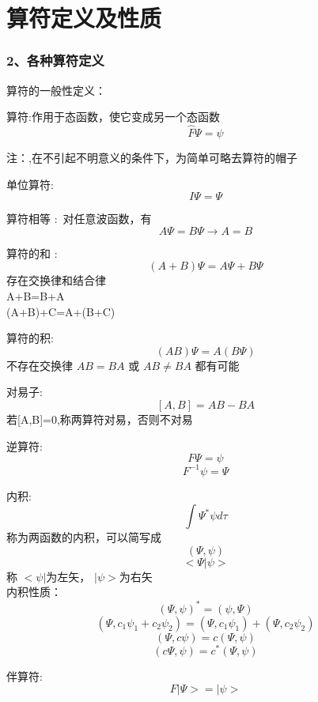 \section{算符定义及性质}

\begin{frame} [allowframebreaks=]
    \frametitle{2、各种算符定义}
    算符的一般性定义：
    \begin{definition}
        算符:作用于态函数，使它变成另一个态函数
        $$ \hat{F} \Psi=\psi$$
    \end{definition}
    注：,在不引起不明意义的条件下，为简单可略去算符的帽子
    \begin{definition}
        单位算符:
        $$ I\Psi=\Psi $$
    \end{definition}
    \begin{definition}
        算符相等 : 对任意波函数，有
        $$ A\Psi=B\Psi \to A=B $$
    \end{definition}
    \begin{definition}
        算符的和 : 
        $$ (A+B)\Psi=A\Psi+B\Psi $$
        存在交换律和结合律\\
        A+B=B+A\\
        (A+B)+C=A+(B+C)
    \end{definition}
    \begin{definition}
        算符的积: 
        $$ (AB)\Psi=A(B\Psi) $$
        不存在交换律
        $AB=BA$ 或 $AB\ne BA$ 都有可能
    \end{definition}
    \begin{definition}
        对易子: 
        $$ [A,B]=AB-BA$$
        若[A,B]=0,称两算符对易，否则不对易
    \end{definition}
    \begin{definition}
        逆算符: 
        $$ F\Psi=\psi $$
        $$ F^{-1}\psi=\Psi $$
    \end{definition}
    \begin{definition}
        内积: 
        $$ \int\Psi^*\psi d \tau$$
        称为两函数的内积，可以简写成
        $$ (\Psi,\psi)$$ 
        $$ <\Psi|\psi>$$
        称 $ <\psi|$为左矢， $|\psi>$为右矢\\
        内积性质：
        $$ (\Psi,\psi)^*=(\psi,\Psi)$$ 
        $$ (\Psi,c_1\psi_1+c_2\psi_2)=(\Psi,c_1\psi_1)+(\Psi,c_2\psi_2)$$ 
        $$ (\Psi,c\psi)=c(\Psi,\psi)$$ 
        $$ (c\Psi,\psi)=c^*(\Psi,\psi)$$ 
    \end{definition} 
    \begin{definition}
        伴算符: 
        $$ F|\Psi> = |\psi> $$

\end{definition}
\end{frame}
